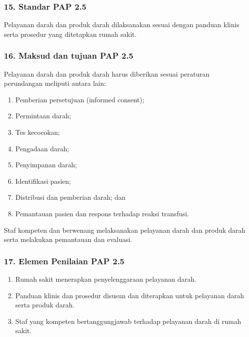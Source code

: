 \documentclass[
]{book}
\providecommand{\tightlist}{%
  \setlength{\itemsep}{0pt}\setlength{\parskip}{0pt}}
\begin{document}
\hypertarget{standar-pap-2.5}{%
\subsubsection*{15. Standar PAP 2.5}\label{standar-pap-2.5}}

Pelayanan darah dan produk darah dilaksanakan sesuai dengan panduan klinis serta prosedur yang ditetapkan rumah sakit.

\hypertarget{maksud-dan-tujuan-pap-2.5}{%
\subsubsection*{16. Maksud dan tujuan PAP 2.5}\label{maksud-dan-tujuan-pap-2.5}}

Pelayanan darah dan produk darah harus diberikan sesuai peraturan perundangan meliputi antara lain:

\begin{enumerate}
\def\labelenumi{\alph{enumi}.}
\tightlist
\item
  Pemberian persetujuan (informed consent);
\item
  Permintaan darah;
\item
  Tes kecocokan;
\item
  Pengadaan darah;
\item
  Penyimpanan darah;
\item
  Identifikasi pasien;
\item
  Distribusi dan pemberian darah; dan
\item
  Pemantauan pasien dan respons terhadap reaksi transfusi.
\end{enumerate}

Staf kompeten dan berwenang melaksanakan pelayanan darah dan produk darah serta melakukan pemantauan dan evaluasi.

\hypertarget{elemen-penilaian-pap-2.5}{%
\subsubsection*{17. Elemen Penilaian PAP 2.5}\label{elemen-penilaian-pap-2.5}}

\begin{enumerate}
\def\labelenumi{\alph{enumi}.}
\tightlist
\item
  Rumah sakit menerapkan penyelenggaraan pelayanan darah.
\item
  Panduan klinis dan prosedur disusun dan diterapkan untuk pelayanan darah serta produk darah.
\item
  Staf yang kompeten bertanggungjawab terhadap pelayanan darah di rumah sakit.
\end{enumerate}
\end{document}
